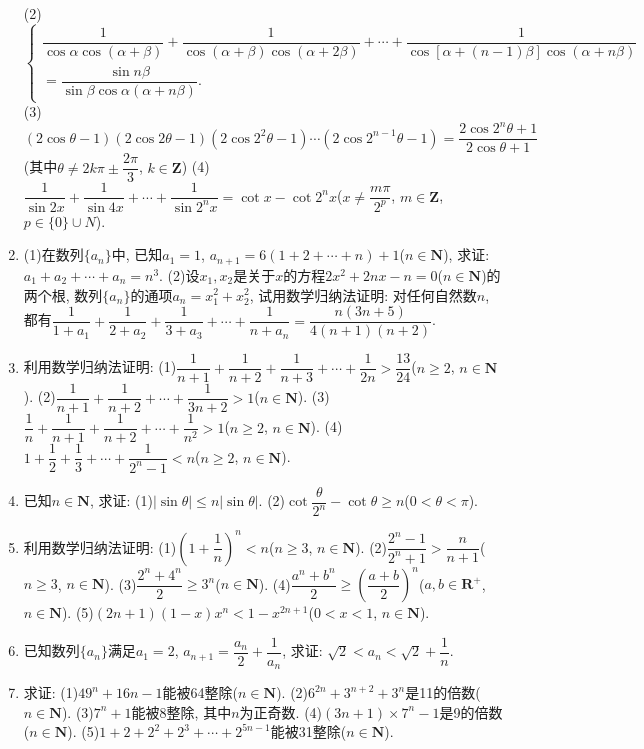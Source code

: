 \documentclass[10pt,a4paper]{article}
\begin{document}
\begin{enumerate}[1.]
(2)$\begin{cases} \dfrac 1{\cos \alpha \cos (\alpha +\beta)}+\dfrac 1{\cos (\alpha +\beta)\cos (\alpha +2\beta)}+\cdots +\dfrac 1{\cos [\alpha +(n-1)\beta]\cos (\alpha +n\beta)} \\ =\dfrac{\sin n\beta }{\sin \beta \cos \alpha (\alpha +n\beta)}. \end{cases}$
(3)$(2\cos \theta -1)(2\cos 2\theta -1)(2\cos 2^2\theta -1)\cdots (2\cos 2^{n-1}\theta -1)=\dfrac{2\cos {2^n}\theta +1}{2\cos \theta +1}$(其中$\theta \ne 2k\pi \pm \dfrac{2\pi }3$, $k\in \mathbf{Z}$)
(4)$\dfrac 1{\sin 2x}+\dfrac 1{\sin 4x}+\cdots +\dfrac 1{\sin 2^nx}=\cot x-\cot 2^nx$($x\ne \dfrac{m\pi }{2^p}$, $m\in \mathbf{Z}$, $p\in \{0\}\cup N$).
\item (1)在数列$\{a_n\}$中, 已知$a_1=1$, $a_{n+1}=6(1+2+\cdots +n)+1$($n\in \mathbf{N}$), 求证: $a_1+a_2+\cdots +a_n=n^3$.
(2)设$x_1,x_2$是关于$x$的方程$2x^2+2nx-n=0$($n\in \mathbf{N}$)的两个根, 数列$\{a_n\}$的通项$a_n=x_1^2+x_2^2$, 试用数学归纳法证明: 对任何自然数$n$, 都有$\dfrac 1{1+a_1}+\dfrac 1{2+a_2}+\dfrac 1{3+a_3}+\cdots +\dfrac 1{n+a_n}=\dfrac{n(3n+5)}{4(n+1)(n+2)}$.
\item 利用数学归纳法证明:
(1)$\dfrac 1{n+1}+\dfrac 1{n+2}+\dfrac 1{n+3}+\cdots +\dfrac 1{2n}>\dfrac{13}{24}$($n\ge 2$, $n\in \mathbf{N}$).
(2)$\dfrac 1{n+1}+\dfrac 1{n+2}+\cdots +\dfrac 1{3n+2}>1$($n\in \mathbf{N}$).
(3)$\dfrac 1n+\dfrac 1{n+1}+\dfrac 1{n+2}+\cdots +\dfrac 1{n^2}>1$($n\ge 2$, $n\in \mathbf{N}$).
(4)$1+\dfrac 12+\dfrac 13+\cdots +\dfrac 1{2^n-1}<n$($n\ge 2$, $n\in \mathbf{N}$).
\item 已知$n\in \mathbf{N}$, 求证:
(1)$|\sin \theta|\le n|\sin \theta|$.
(2)$\cot \dfrac{\theta }{2^n}-\cot \theta \ge n$($0<\theta <\pi$).
\item 利用数学归纳法证明:
(1)$(1+\dfrac 1n)^n<n$($n\ge 3$, $n\in \mathbf{N}$).
(2)$\dfrac{{2^n}-1}{{2^n}+1}>\dfrac n{n+1}$($n\ge 3$, $n\in \mathbf{N}$).
(3)$\dfrac{2^n+4^n}2\ge 3^n$($n\in \mathbf{N}$).
(4)$\dfrac{a^n+b^n}2\ge (\dfrac{a+b}2)^n$($a,b\in \mathbf{R}^+$, $n\in \mathbf{N}$).
(5)$(2n+1)(1-x)x^n<1-x^{2n+1}$($0<x<1$, $n\in \mathbf{N}$).
\item 已知数列$\{a_n\}$满足$a_1=2$, $a_{n+1}=\dfrac{a_n}2+\dfrac 1{a_n}$, 求证: $\sqrt 2<a_n<\sqrt 2+\dfrac 1n$.
\item 求证:
(1)$49^n+16n-1$能被64整除($n\in \mathbf{N}$).
(2)$6^{2n}+3^{n+2}+3^n$是11的倍数($n\in \mathbf{N}$).
(3)$7^n+1$能被8整除, 其中$n$为正奇数.
(4)$(3n+1)\times 7^n-1$是9的倍数($n\in \mathbf{N}$).
(5)$1+2+2^2+2^3+\cdots +2^{5n-1}$能被31整除($n\in \mathbf{N}$).

\end{enumerate}
\end{document}
